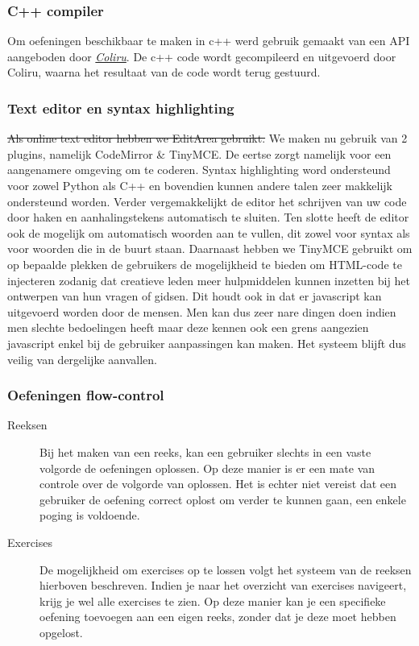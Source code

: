 \subsubsection{C++ compiler}
Om oefeningen beschikbaar te maken in c++ werd gebruik gemaakt van een API aangeboden door
\href{http://coliru.stacked-crooked.com/}{\emph{Coliru}}. De c++ code wordt gecompileerd en uitgevoerd door Coliru,
waarna het resultaat van de code wordt terug gestuurd.

\subsubsection{Text editor en syntax highlighting}
\st{Als online text editor hebben we EditArea gebruikt.}
We maken nu gebruik van 2 plugins, namelijk CodeMirror \& TinyMCE. De eertse zorgt namelijk voor een aangenamere omgeving om te coderen. Syntax highlighting word ondersteund voor zowel Python als C++ en bovendien kunnen andere talen zeer makkelijk ondersteund worden. Verder vergemakkelijkt de editor het schrijven van uw code door haken en aanhalingstekens automatisch te sluiten. Ten slotte heeft de editor ook de mogelijk om automatisch woorden aan te vullen, dit zowel voor syntax als voor woorden die in de buurt staan. Daarnaast hebben we TinyMCE gebruikt om op bepaalde plekken de gebruikers de mogelijkheid te bieden om HTML-code te injecteren zodanig dat creatieve leden meer hulpmiddelen kunnen inzetten bij het ontwerpen van hun vragen of gidsen. Dit houdt ook in dat er javascript kan uitgevoerd worden door de mensen. Men kan dus zeer nare dingen doen indien men slechte bedoelingen heeft maar deze kennen ook een grens aangezien javascript enkel bij de gebruiker aanpassingen kan maken. Het systeem blijft dus veilig van dergelijke aanvallen.

\subsubsection{Oefeningen flow-control}
\begin{description}
\item[Reeksen] Bij het maken van een reeks, kan een gebruiker slechts in een vaste volgorde de oefeningen oplossen. Op deze manier is er
een mate van controle over de volgorde van oplossen. Het is echter niet vereist dat een gebruiker de oefening correct oplost
om verder te kunnen gaan, een enkele poging is voldoende.
\item[Exercises] De mogelijkheid om exercises op te lossen volgt het systeem van de reeksen hierboven beschreven. Indien je naar het
    overzicht van exercises navigeert, krijg je wel alle exercises te zien. Op deze manier kan je een specifieke oefening toevoegen 
    aan een eigen reeks, zonder dat je deze moet hebben opgelost.
\end{description}

